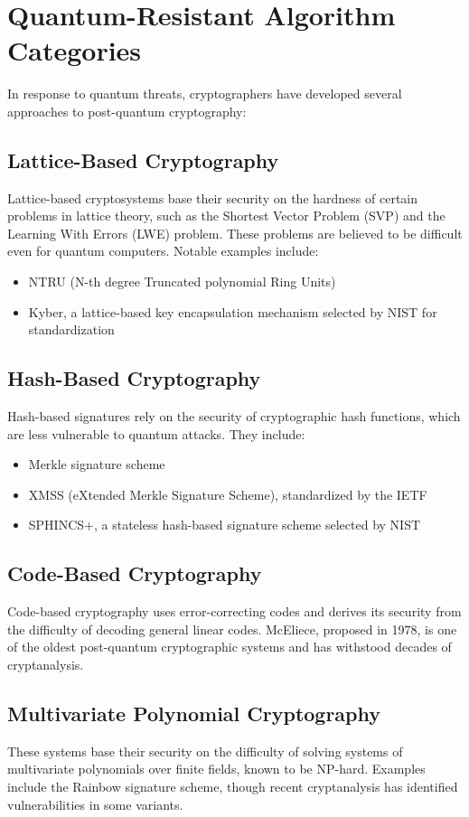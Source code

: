 \section{Quantum-Resistant Algorithm Categories}
In response to quantum threats, cryptographers have developed several approaches to post-quantum cryptography:

\subsection{Lattice-Based Cryptography}
Lattice-based cryptosystems base their security on the hardness of certain problems in lattice theory, such as the Shortest Vector Problem (SVP) and the Learning With Errors (LWE) problem. These problems are believed to be difficult even for quantum computers. Notable examples include:
\begin{itemize}
    \item NTRU (N-th degree Truncated polynomial Ring Units)
    \item Kyber, a lattice-based key encapsulation mechanism selected by NIST for standardization
\end{itemize}

\subsection{Hash-Based Cryptography}
Hash-based signatures rely on the security of cryptographic hash functions, which are less vulnerable to quantum attacks. They include:
\begin{itemize}
    \item Merkle signature scheme
    \item XMSS (eXtended Merkle Signature Scheme), standardized by the IETF
    \item SPHINCS+, a stateless hash-based signature scheme selected by NIST
\end{itemize}

\subsection{Code-Based Cryptography}
Code-based cryptography uses error-correcting codes and derives its security from the difficulty of decoding general linear codes. McEliece, proposed in 1978, is one of the oldest post-quantum cryptographic systems and has withstood decades of cryptanalysis.

\subsection{Multivariate Polynomial Cryptography}
These systems base their security on the difficulty of solving systems of multivariate polynomials over finite fields, known to be NP-hard. Examples include the Rainbow signature scheme, though recent cryptanalysis has identified vulnerabilities in some variants.

